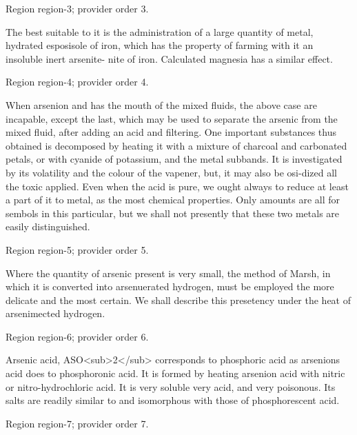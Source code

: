 \documentclass[11pt]{article}
\begin{document}
{\scriptsize\color{gray} Region region-3; provider order 3.\par}
\medskip

The best suitable to it is the administration of a large quantity of metal, hydrated esposisole of iron, which has the property of farming with it an insoluble inert arsenite- nite of iron. Calculated magnesia has a similar effect.
\par

{\scriptsize\color{gray} Region region-4; provider order 4.\par}
\medskip

When arsenion and has the mouth of the mixed fluids, the above case are incapable, except the last, which may be used to separate the arsenic from the mixed fluid, after adding an acid and filtering. One important substances thus obtained is decomposed by heating it with a mixture of charcoal and carbonated petals, or with cyanide of potassium, and the metal subbands. It is investigated by its volatility and the colour of the vapener, but, it may also be osi-dized all the toxic applied. Even when the acid is pure, we ought always to reduce at least a part of it to metal, as the most chemical properties. Only amounts are all for sembols in this particular, but we shall not presently that these two metals are easily distinguished.
\par

{\scriptsize\color{gray} Region region-5; provider order 5.\par}
\medskip

Where the quantity of arsenic present is very small, the method of Marsh, in which it is converted into arsenuerated hydrogen, must be employed the more delicate and the most certain. We shall describe this presetency under the heat of arsenimected hydrogen.
\par

{\scriptsize\color{gray} Region region-6; provider order 6.\par}
\medskip

Arsenic acid, ASO<sub>2</sub> corresponds to phosphoric acid as arsenions acid does to phosphoronic acid. It is formed by heating arsenion acid with nitric or nitro-hydrochloric acid. It is very soluble very acid, and very poisonous. Its salts are readily similar to and isomorphous with those of phosphorescent acid.
\par

{\scriptsize\color{gray} Region region-7; provider order 7.\par}
\medskip
\end{document}
